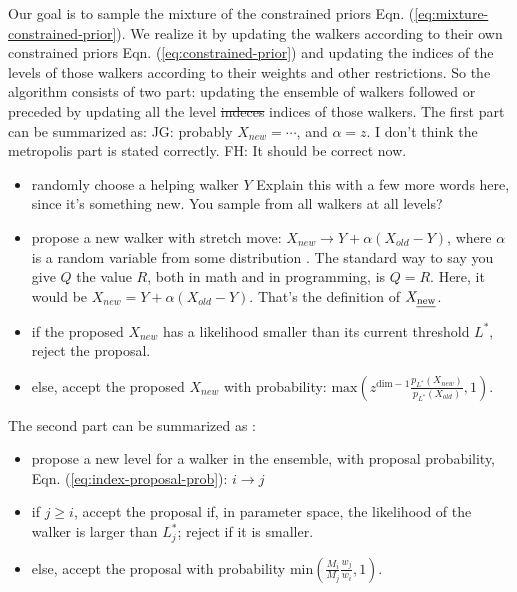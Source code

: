 \documentclass[letterpaper, preprint]{aastex}
\newcommand{\qer}[1]{{\color{red}#1}}
\begin{document}
Our goal is to sample the mixture of the constrained priors Eqn. (\ref{eq:mixture-constrained-prior}). We realize it by updating the walkers according to their own constrained priors Eqn. (\ref{eq:constrained-prior}) and updating the indices of the levels of those walkers according to their weights and other restrictions. So the algorithm consists of two part: updating the ensemble of walkers followed or preceded by updating all the level \sout{indeces} \qer{indices} of those walkers. The first part can be summarized as:
\qer{JG: probably $X_{new} = \cdots$, and $\alpha=z$.  I don't think the 
metropolis part is stated correctly.} \qer{FH: It should be correct now.}
\begin{sffamily}
\begin{itemize}
\item randomly choose a helping walker $Y$ \qer{Explain this with a few more words here, since
it's something new.  You sample from all walkers at all levels?}
\item propose a new walker with stretch move: $X_{new} \rightarrow Y + \alpha (X_{old}-Y)$, where $\alpha$ is a random variable from some distribution \citep{goodman10a}.
\qer{The standard way to say you give $Q$ the value $R$, both in math and in programming, is 
$Q=R$.  Here, it would be $X_{new} = Y + \alpha (X_{old}-Y)$. 
That's the definition of $X_{\mbox{\scriptsize \em new}}$.}
\item if the proposed $X_{new}$ has a likelihood smaller than its current threshold $L^*$, reject the proposal.
\item else, accept the proposed $X_{new}$ with probability: $\mathrm{max}\left(z^{\mathrm{dim}-1}\frac{p_{L^*}(X_{new})}{p_{L^*}(X_{old})},1\right)$.
\end{itemize}
\end{sffamily}
The second part can be summarized as \citep{brewer11a}:
\begin{sffamily}
\begin{itemize}
\item propose a new level for a walker in the ensemble, with proposal probability, Eqn. (\ref{eq:index-proposal-prob}): $i \rightarrow j$
\item if $j \geq i$, accept the proposal if, in parameter space, the likelihood of the walker is larger than $L_j^*$; reject if it is smaller.
\item else, accept the proposal with probability $\mathrm{min}\left(\frac{M_i}{M_j}\frac{w_j}{w_i},1\right)$.
\end{itemize}
\end{sffamily}
\end{document}
